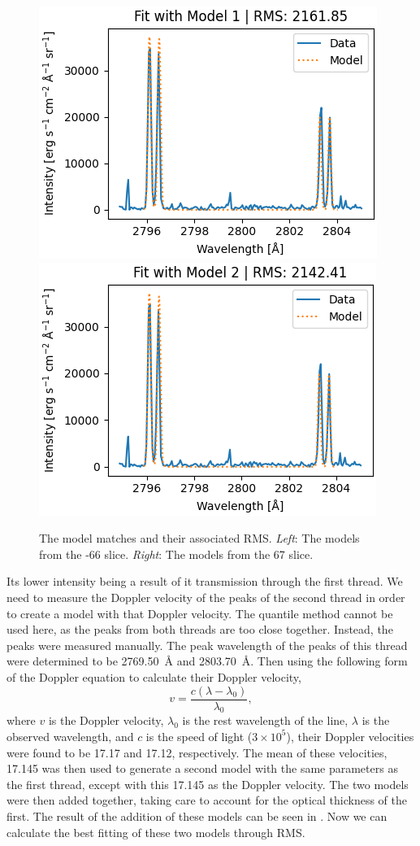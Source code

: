\begin{figure}
    \includegraphics[width=0.49\linewidth]{./03Modelling2D/figs/invert/invert1.png}
    \includegraphics[width=0.49\linewidth]{./03Modelling2D/figs/invert/invert2.png}
    \caption[The model matches and their associated RMS.]{The model matches and their associated RMS. \textit{Left}: The models from the -66\kms{} slice. \textit{Right}: The models from the 67\kms{} slice.}
    \label{lastmodelfit}
\end{figure}
Its lower intensity being a result of it transmission through the first thread. We need to measure the Doppler velocity of the peaks of the second thread in order to create a model with that Doppler velocity. The quantile method cannot be used here, as the peaks from both threads are too close together. Instead, the peaks were measured manually. The peak wavelength of the \mgiihk{} peaks of this thread were determined to be 2769.50~\AA{} and 2803.70~\AA{}. Then using the following form of the Doppler equation to calculate their Doppler velocity,
\begin{equation}
    v=\frac{c(\lambda-\lambda_0)}{\lambda_0},
\end{equation}
where $v$ is the Doppler velocity, $\lambda_0$ is the rest wavelength of the line, $\lambda$ is the observed wavelength, and $c$ is the speed of light ($3\times10^5$\kms), their Doppler velocities were found to be 17.17\kms{} and 17.12\kms{}, respectively. The mean of these velocities, 17.145\kms{} was then used to generate a second model with the same parameters as the first thread, except with this 17.145\kms{} as the Doppler velocity. The two models were then added together, taking care to account for the optical thickness of the first. The result of the addition of these models can be seen in . Now we can calculate the best fitting of these two models through RMS. 

